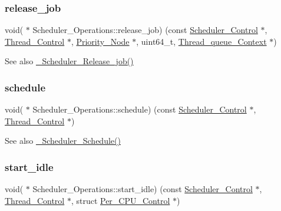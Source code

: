 \subsubsection{\texorpdfstring{release\_job}{release\_job}}
{\footnotesize\ttfamily void( $\ast$ Scheduler\+\_\+\+Operations\+::release\+\_\+job) (const \mbox{\hyperlink{struct__Scheduler__Control}{Scheduler\+\_\+\+Control}} $\ast$, \mbox{\hyperlink{struct__Thread__Control}{Thread\+\_\+\+Control}} $\ast$, \mbox{\hyperlink{structPriority__Node}{Priority\+\_\+\+Node}} $\ast$, uint64\+\_\+t, \mbox{\hyperlink{structThread__queue__Context}{Thread\+\_\+queue\+\_\+\+Context}} $\ast$)}

\begin{DoxySeeAlso}{See also}
\mbox{\hyperlink{group__RTEMSScoreScheduler_gaf53f73c8af714527362915d8deee178b}{\+\_\+\+Scheduler\+\_\+\+Release\+\_\+job()}} 
\end{DoxySeeAlso}
\mbox{\label{structScheduler__Operations_aff5c491f2a2da3c2c02b2aa3933579de}} 
\subsubsection{\texorpdfstring{schedule}{schedule}}
{\footnotesize\ttfamily void( $\ast$ Scheduler\+\_\+\+Operations\+::schedule) (const \mbox{\hyperlink{struct__Scheduler__Control}{Scheduler\+\_\+\+Control}} $\ast$, \mbox{\hyperlink{struct__Thread__Control}{Thread\+\_\+\+Control}} $\ast$)}

\begin{DoxySeeAlso}{See also}
\mbox{\hyperlink{group__RTEMSScoreScheduler_ga8ae120060b9523ac05e0aaf3e9f2b4d9}{\+\_\+\+Scheduler\+\_\+\+Schedule()}} 
\end{DoxySeeAlso}
\mbox{\label{structScheduler__Operations_a1393904c5c9b8b964ed1c8d225467d22}} 
\subsubsection{\texorpdfstring{start\_idle}{start\_idle}}
{\footnotesize\ttfamily void( $\ast$ Scheduler\+\_\+\+Operations\+::start\+\_\+idle) (const \mbox{\hyperlink{struct__Scheduler__Control}{Scheduler\+\_\+\+Control}} $\ast$, \mbox{\hyperlink{struct__Thread__Control}{Thread\+\_\+\+Control}} $\ast$, struct \mbox{\hyperlink{structPer__CPU__Control}{Per\+\_\+\+C\+P\+U\+\_\+\+Control}} $\ast$)}

